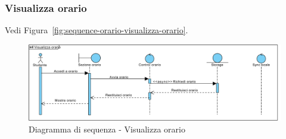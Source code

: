 \subsubsection{Visualizza orario}

Vedi Figura~\vref{fig:sequence-orario-visualizza-orario}.

\begin{figure}
	\centering
	\includegraphics[width=\textwidth]{imgs/gruppo2/sequence-orario-visualizza-orario.pdf}
	\caption{Diagramma di sequenza - Visualizza orario}
	\label{fig:sequence-orario-visualizza-orario}
\end{figure}

\clearpage